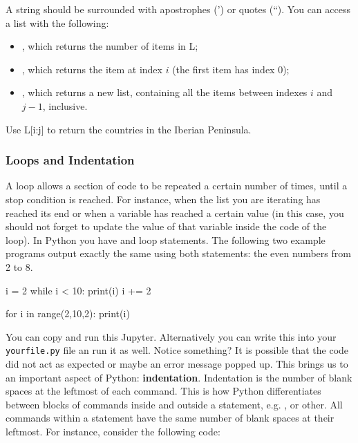 \noindent A string should be surrounded with apostrophes (') or quotes (``). You can access a list with
the following:

\begin{itemize}
 \item {}, which returns the number of items in L;
 \item {}, which returns the item at index $i$ (the first item has index 0);
 \item {}, which returns a new list, containing all the items between indexes $i$ and $j-1$, inclusive. 
\end{itemize}

\begin{exercise}
 Use L[i:j] to return the countries in the Iberian Peninsula.
\end{exercise}

\subsubsection{Loops and Indentation}

A loop allows a section of code to be repeated a certain number of times, until
a stop condition is reached. For instance, when the list you are iterating has
reached its end or when a variable has reached a certain value (in this case,
you should not forget to update the value of that variable inside the code of
the loop). In Python you have  and  loop statements. The
following two example programs output exactly the same using both statements:
the even numbers from 2 to 8.

\begin{python}
i = 2
while i < 10:
  print(i)
  i += 2 
\end{python}

\begin{python}
for i in range(2,10,2):
    print(i)
\end{python}

You can copy and run this Jupyter. Alternatively you can write this into your
\texttt{yourfile.py} file an run it as well. Notice something? It is possible
that the code did not act as expected or maybe an error message popped up. This
brings us to an important aspect of Python: \textbf{indentation}. Indentation
is the number of blank spaces at the leftmost of each command. This is how
Python differentiates between blocks of commands inside and outside a
statement, e.g. ,  or other. All commands within a
statement have the same number of blank spaces at their leftmost. For instance,
consider the following code: 

